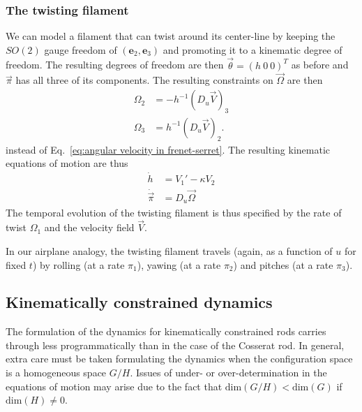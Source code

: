 
\subsubsection*{The twisting filament}

We can model a filament that can twist around its center-line by keeping the $SO(2)$ gauge freedom of $(\mathbf{e}_2, \mathbf{e}_3)$ and promoting it to a kinematic degree of freedom. The resulting degrees of freedom are then $\vec{\theta} = (h\ 0\ 0)^T$ as before and $\vec{\pi}$ has all three of its components. The resulting constraints on $\vec{\Omega}$ are then
\begin{subequations} \label{eq:angular velocity for twisting filament}
\begin{align}
\Omega_2 & = - h^{-1} (D_u \vec{V})_3 \\
\Omega_3 & = h^{-1} (D_u \vec{V})_2.
\end{align}
\end{subequations}
instead of Eq.~\ref{eq:angular velocity in frenet-serret}. The resulting kinematic equations of motion are thus
\begin{subequations} \label{eq:twisting filament kinematic equtions of motion}
\begin{align}
\dot{h} & = V_1' - \kappa V_2 \\
\dot{\vec{\pi}} & = D_u \vec{\Omega}
\end{align}
\end{subequations}
The temporal evolution of the twisting filament is thus specified by the rate of twist $\Omega_1$ and the velocity field $\vec{V}$.

In our airplane analogy, the twisting filament travels (again, as a function of $u$ for fixed $t$) by rolling (at a rate $\pi_1$), yawing (at a rate $\pi_2$) and pitches (at a rate $\pi_3$).

\subsection{Kinematically constrained dynamics} \label{sec:Kinematically constrained dynamics (cosserat rod)}

The formulation of the dynamics for kinematically constrained rods carries through less programmatically than in the case of the Cosserat rod. In general, extra care must be taken formulating the dynamics when the configuration space is a homogeneous space $G / H$. Issues of under- or over-determination in the equations of motion may arise due to the fact that $\text{dim}(G/H) < \text{dim}(G)$ if $\text{dim}(H) \neq 0$.

